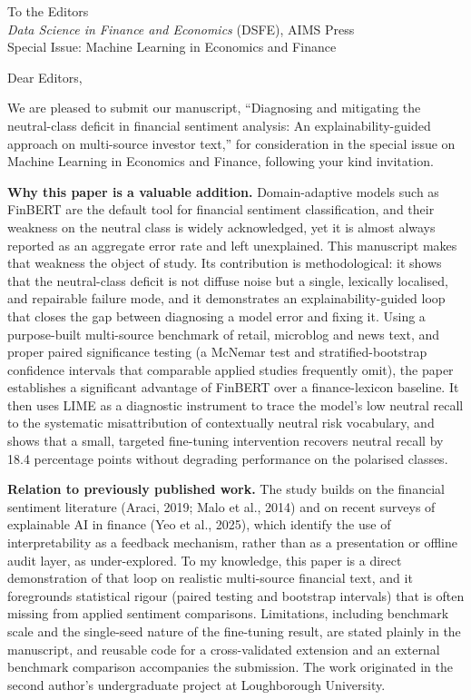 \documentclass[11pt,a4paper]{article}
\begin{document}
\noindent [Date]

\bigskip
\noindent To the Editors\\
\emph{Data Science in Finance and Economics} (DSFE), AIMS Press\\
Special Issue: Machine Learning in Economics and Finance

\bigskip
\noindent Dear Editors,

We are pleased to submit our manuscript, ``Diagnosing and mitigating the
neutral-class deficit in financial sentiment analysis: An explainability-guided
approach on multi-source investor text,'' for consideration in the special issue on
Machine Learning in Economics and Finance, following your kind invitation.

\textbf{Why this paper is a valuable addition.} Domain-adaptive models such as
FinBERT are the default tool for financial sentiment classification, and their
weakness on the neutral class is widely acknowledged, yet it is almost always
reported as an aggregate error rate and left unexplained. This manuscript makes that
weakness the object of study. Its contribution is methodological: it shows that the
neutral-class deficit is not diffuse noise but a single, lexically localised, and
repairable failure mode, and it demonstrates an explainability-guided loop that
closes the gap between diagnosing a model error and fixing it. Using a purpose-built
multi-source benchmark of retail, microblog and news text, and proper paired
significance testing (a McNemar test and stratified-bootstrap confidence intervals
that comparable applied studies frequently omit), the paper establishes a significant
advantage of FinBERT over a finance-lexicon baseline. It then uses LIME as a
diagnostic instrument to trace the model's low neutral recall to the systematic
misattribution of contextually neutral risk vocabulary, and shows that a small,
targeted fine-tuning intervention recovers neutral recall by 18.4 percentage points
without degrading performance on the polarised classes.

\textbf{Relation to previously published work.} The study builds on the financial
sentiment literature (Araci, 2019; Malo et al., 2014) and on recent surveys of
explainable AI in finance (Yeo et al., 2025), which identify the use of
interpretability as a feedback mechanism, rather than as a presentation or offline
audit layer, as under-explored. To my knowledge, this paper is a direct
demonstration of that loop on realistic multi-source financial text, and it
foregrounds statistical rigour (paired testing and bootstrap intervals) that is
often missing from applied sentiment comparisons. Limitations, including benchmark
scale and the single-seed nature of the fine-tuning result, are stated plainly in
the manuscript, and reusable code for a cross-validated extension and an external
benchmark comparison accompanies the submission. The work originated in the second
author's undergraduate project at Loughborough University.
\end{document}
